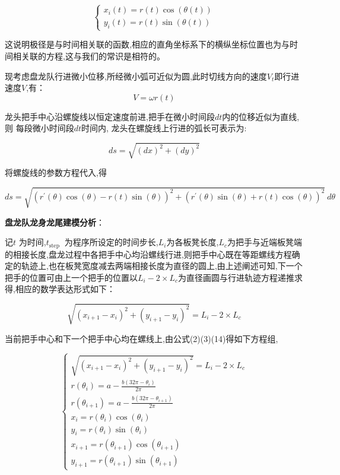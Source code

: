 \begin{equation}
	\left\{\begin{matrix}x_i(t)=r(t)\cos(\theta(t)) \\
		y_i(t)=r(t)\sin(\theta(t))\end{matrix}\right.
\end{equation}

这说明极径是与时间相关联的函数,相应的直角坐标系下的横纵坐标位置也为与时间相关联的方程,这与我们的常识是相符的。

现考虑盘龙队行进微小位移,所经微小弧可近似为圆,此时切线方向的速度$V_t$即行进速度$V$,有：
\begin{equation}
	V =\omega r(t)
\end{equation}

龙头把手中心沿螺旋线以恒定速度前进,把手在微小时间段$dt$内的位移近似为直线,则
每段微小时间段$dt$时间内, 龙头在螺旋线上行进的弧长可表示为:

\begin{equation}
	ds=\sqrt{(d x)^2+(d y)^2}
\end{equation}

将螺旋线的参数方程代入,得

\begin{equation}
	ds=\sqrt{\left(r^{\prime}(\theta) \cos (\theta)-r(t) \sin (\theta)\right)^2+\left(r^{\prime}(\theta) \sin (\theta)+r(t) \cos (\theta)\right)^2} \: d\theta
\end{equation}

\textbf{盘龙队龙身龙尾建模分析}：

记$t$ 为时间,$t_{\text {step }}$ 为程序所设定的时间步长,$L_i$为各板凳长度,$L_c$为把手与近端板凳端的相接长度,盘龙过程中各把手中心均沿螺线行进,则把手中心既在等距螺线方程确定的轨迹上,也在板凳宽度减去两端相接长度为直径的圆上,由上述阐述可知,下一个把手的位置可由上一个把手的位置以$L_i - 2 \times L_c$为直径画圆与行进轨迹方程递推求得,相应的数学表达形式如下：

\begin{equation}
	\sqrt{(x_{i+1}-x_i)^2+(y_{i+1}-y_i)^2}=L_i - 2 \times L_c
\end{equation}

当前把手中心和下一个把手中心均在螺线上,由公式(2)(3)(14)得如下方程组,

\begin{equation}
	\begin{cases}
		\sqrt{(x_{i+1}-x_i)^2+(y_{i+1}-y_i)^2} = L_i - 2 \times L_c \\[1ex]
		r(\theta_i) = a - \frac{b(32\pi - \theta_i)}{2\pi} \\[1ex]
		r(\theta_{i+1}) = a - \frac{b(32\pi - \theta_{i+1})}{2\pi} \\[1ex]
		x_i = r(\theta_i) \cos(\theta_i) \\[1ex]
		y_i = r(\theta_i) \sin(\theta_i) \\[1ex]
		x_{i+1} = r(\theta_{i+1}) \cos(\theta_{i+1}) \\[1ex]
		y_{i+1} = r(\theta_{i+1}) \sin(\theta_{i+1})
	\end{cases}
\end{equation}

